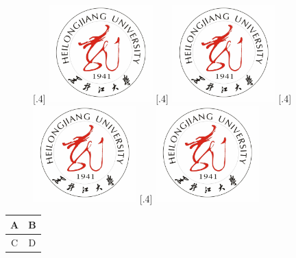 \begin{figure}[h]
    \centering
    [.4\textwidth]
        {\includegraphics[width=40mm]{img/hlju_logo.jpg}}
    [.4\textwidth]
        {\includegraphics[width=40mm]{img/hlju_logo.jpg}}
    [.4\textwidth]
        {\includegraphics[width=40mm]{img/hlju_logo.jpg}}
    [.4\textwidth]
        {\includegraphics[width=40mm]{img/hlju_logo.jpg}}
\end{figure}

\begin{table}[h]
    \label{Tab:1}
    \centering
    \begin{tabular}{|c|c|}
        A & B \\
        \hline
        C & D \\
    \end{tabular}
\end{table}